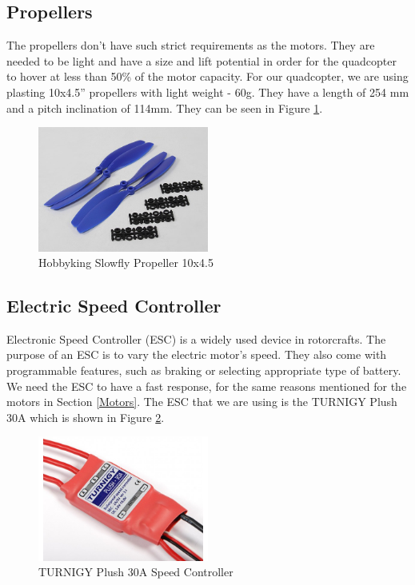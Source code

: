\subsection{Propellers}
The propellers don't have such strict requirements as the motors. They are needed to be light and have a size and lift potential in order for the quadcopter to hover at less than 50\% of the motor capacity. For our quadcopter, we are using plasting 10x4.5'' propellers with light weight - 60g. They have a length of 254 mm and a pitch inclination of 114mm. They can be seen in Figure \ref{propeller}.

\begin{figure}[H]
  \centering
    \includegraphics[width=0.5\textwidth]{images/propeller.jpg}
	\caption{Hobbyking Slowfly Propeller 10x4.5}
	\label{propeller}
\end{figure}

\subsection{Electric Speed Controller}
Electronic Speed Controller (ESC) is a widely used device in rotorcrafts. The purpose of an ESC is to vary the electric motor's speed. They also come with programmable features, such as braking or selecting appropriate type of battery. We need the ESC to have a fast response, for the same reasons mentioned for the motors in Section \ref{Motors}. The ESC that we are using is the TURNIGY Plush 30A which is shown in Figure \ref{esc}.
 
\begin{figure}[H]
  \centering
    \includegraphics[width=0.5\textwidth]{images/esc.jpg}
	\caption{TURNIGY Plush 30A Speed Controller}
	\label{esc}
\end{figure}

